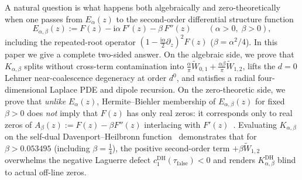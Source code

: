 \documentclass[11pt,reqno]{amsart}
\theoremstyle{definition}
\theoremstyle{remark}
\numberwithin{equation}{section}
\newcommand{\ii}{\mathrm{i}}
\begin{document}
A natural question is what happens both algebraically and zero-theoretically when one passes from $E_\alpha(z)$ to the second-order differential structure function
\begin{equation}\label{eq:intro_E_alpha_beta}
E_{\alpha,\beta}(z) := F(z) - \ii\alpha\,F'(z) - \beta\,F''(z) \qquad (\alpha > 0,\; \beta > 0),
\end{equation}
including the repeated-root operator $(1 - \frac{\ii\alpha}{2}\partial_z)^2 F(z)$ ($\beta = \alpha^2/4$). In this paper we give a complete two-sided answer. On the algebraic side, we prove that $K_{\alpha,\beta}$ splits without cross-term contamination into $\frac{\alpha}{\pi}\widetilde{W}_{0,1} + \frac{\alpha\beta}{\pi}\widetilde{W}_{1,2}$, lifts the $d=0$ Lehmer near-coalescence degeneracy at order $d^0$, and satisfies a radial four-dimensional Laplace PDE and dipole recursion. On the zero-theoretic side, we prove that \emph{unlike} $E_\alpha(z)$, Hermite--Biehler membership of $E_{\alpha,\beta}(z)$ for fixed $\beta > 0$ does \emph{not} imply that $F(z)$ has only real zeros: it corresponds only to real zeros of $A_\beta(z) := F(z) - \beta F''(z)$ interlacing with $F'(z)$~\cite{debranges1968,jensen1913,polya1927}. Evaluating $K_{\alpha,\beta}$ on the self-dual Davenport--Heilbronn function~\cite{davenportheilbronn1936} demonstrates that for $\beta > 0.053495$ (including $\beta = \frac{1}{4}$), the positive second-order term $+\beta\widetilde{W}_{1,2}$ overwhelms the negative Laguerre defect $c_1^{\mathrm{DH}}(\tau_{\mathrm{false}}) < 0$ and renders $K_{\alpha,\beta}^{\mathrm{DH}}$ blind to actual off-line zeros.
\end{document}
